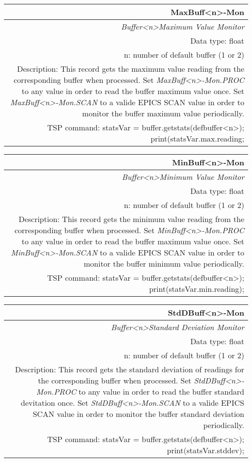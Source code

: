 \documentclass[openany]{article}
\begin{document}
		\begin{tabular}{N}
			\hline
			\bfseries MaxBuff\textless n\textgreater-Mon\label{pv:maxbuff-mon} \\ \hline
			\emph{Buffer\textless n\textgreater Maximum Value Monitor} \\
			Data type: float \\
			n: number of default buffer (1 or 2) \\
			Description: This record gets the maximum value reading from the corresponding buffer when processed. Set \emph{MaxBuff\textless n\textgreater-Mon.PROC} to any value in order to read the buffer maximum value once. Set \emph{MaxBuff\textless n\textgreater-Mon.SCAN} to a valide EPICS SCAN value in order to monitor the buffer maximum value periodically. \\
			TSP command: statsVar = buffer.getstats(defbuffer\textless n\textgreater); print(statsVar.max.reading;
		\end{tabular}

		\begin{tabular}{N}
			\hline
			\bfseries MinBuff\textless n\textgreater-Mon\label{pv:minbuff-mon} \\ \hline
			\emph{Buffer\textless n\textgreater Minimum Value Monitor} \\
			Data type: float \\
			n: number of default buffer (1 or 2) \\
			Description: This record gets the minimum value reading from the corresponding buffer when processed. Set \emph{MinBuff\textless n\textgreater-Mon.PROC} to any value in order to read the buffer maximum value once. Set \emph{MinBuff\textless n\textgreater-Mon.SCAN} to a valide EPICS SCAN value in order to monitor the buffer minimum value periodically. \\
			TSP command: statsVar = buffer.getstats(defbuffer\textless n\textgreater); print(statsVar.min.reading);
		\end{tabular}

		\begin{tabular}{N}
			\hline
			\bfseries StdDBuff\textless n\textgreater-Mon\label{pv:stddbuff-mon} \\ \hline
			\emph{Buffer\textless n\textgreater Standard Deviation Monitor} \\
			Data type: float \\
			n: number of default buffer (1 or 2) \\
			Description: This record gets the standard deviation of readings for the corresponding buffer when processed. Set \emph{StdDBuff\textless n\textgreater-Mon.PROC} to any value in order to read the buffer standard devitation once. Set \emph{StdDBuff\textless n\textgreater-Mon.SCAN} to a valide EPICS SCAN value in order to monitor the buffer standard deviation periodically. \\
			TSP command: statsVar = buffer.getstats(defbuffer\textless n\textgreater); print(statsVar.stddev);
		\end{tabular}
\end{document}
